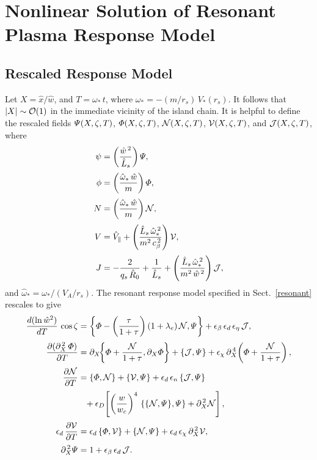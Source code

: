 \documentclass[12pt,prb,aps]{revtex4-1}
\begin{document}
\section{Nonlinear Solution of Resonant Plasma Response Model}
\subsection{Rescaled Response Model}\label{s8.2}
Let
$X = \hat{x}/\hat{w}$,
and
$T = \omega_\ast\,t$,  where $\omega_\ast = - (m/r_s)\,V_\ast(r_s)$. 
It follows that $|X|\sim {\cal O}(1)$ in the immediate vicinity of the island chain. It is helpful to define the
rescaled fields ${\mit\Psi}(X,\zeta,T)$, ${\mit\Phi}(X,\zeta,T)$, ${\cal N}(X,\zeta,T)$,
${\cal V}(X,\zeta,T)$, and ${\cal J}(X,\zeta,T)$, where
\begin{align}
\psi&= \left(\frac{\hat{w}^{\,2}}{\hat{L}_s}\right){\mit\Psi},\label{e466}\\[0.5ex]
\phi &=\left(\frac{\hat{\omega}_\ast\,\hat{w}}{m}\right){\mit\Phi},\\[0.5ex]
N &= \left(\frac{\hat{\omega}_\ast\,\hat{w}}{m}\right){\cal N},\\[0.5ex]
V&= \hat{V}_\parallel + \left(\frac{\hat{L}_s\,\hat{\omega}_\ast^{\,2}}{m^2\,c_\beta^{\,2}}\right){\cal V},\\[0.5ex]
J & =-\frac{2}{q_s\, \hat{R}_0} + \frac{1}{\hat{L}_s} + \left(\frac{\hat{L}_s\,\hat{\omega}_\ast^{\,2}}{m^2\,\hat{w}^{\,2}}\right){\cal J},
\end{align}
and  $\hat{\omega}_\ast = \omega_\ast/(V_A/r_s)$. 
The resonant response model specified in Sect.~\ref{resonant} rescales to give
\begin{align}\label{e469}
\frac{d(\ln \hat{w}^2)}{dT}\,\cos\zeta &= \left\{{\mit\Phi}-\left(\frac{\tau}{1+\tau}\right)(1+\lambda_e)\,{\cal N}, {\mit\Psi}\right\}
+ \epsilon_\beta\,\epsilon_d\,\epsilon_\eta\,{\cal J},\\[0.5ex]
\frac{\partial(\partial_X^{\,2}\,{\mit\Phi})}{\partial T} &= \partial_X\!\!\left\{{\mit\Phi} + \frac{{\cal N}}{1+\tau},\partial_X{\mit\Phi}\right\}
+ \{{\cal J},{\mit\Psi}\}+ \epsilon_\chi \,\partial_X^{\,4}\!\left({\mit\Phi} + \frac{{\cal N}}{1+\tau}\right),\label{e470}\\[0.5ex]
\frac{\partial {\cal N}}{\partial T} &= \{{\mit\Phi}, {\cal N}\} + \{{\cal V},{\mit\Psi}\} + \epsilon_d\,\epsilon_n\,\{{\cal J},{\mit\Psi}\}\nonumber\\[0.5ex]&\phantom{=}
+ \epsilon_D \!\left[\left(\frac{w}{w_c}\right)^4\,\{\{{\cal N},{\mit\Psi}\}, {\mit\Psi}\}+\partial_X^{\,2}{\cal N}\right],\label{e471}\\[0.5ex]
\epsilon_d\,\frac{\partial {\cal V}}{\partial T} &= \epsilon_d\,\{{\mit\Phi},{\cal V}\}+\{{\cal N}, {\mit\Psi}\} + \epsilon_d\,\epsilon_\chi\,\partial_X^{\,2} {\cal V},\label{e472}\\[0.5ex]
\partial_X^{\,2}{\mit\Psi} &= 1+ \epsilon_\beta\,\epsilon_d\,{\cal J}.\label{e473}
\end{align}
\end{document}
